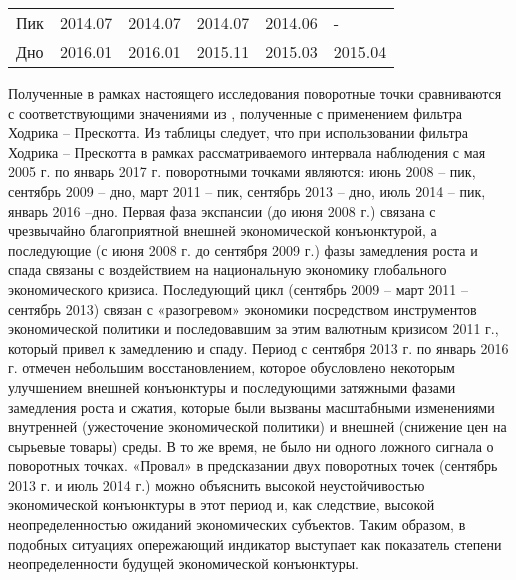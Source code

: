 \documentclass[a4paper,14pt]{extreport}
\begin{document}
\begin{table}[]
\begin{tabular}{|l|l|l|l|l|l|}
				Пик                                                                                                   & 2014.07                                                                                                                                                    & 2014.07                                                                    & 2014.07                                                                          & 2014.06                                                                   & -                                                                                \\
				Дно                                                                                                   & 2016.01                                                                                                                                                    & 2016.01                                                                    & 2015.11                                                                          & 2015.03                                                                   & 2015.04                                                                          \\ \hline
			\end{tabular}
		\label{tbl:tpoints_re}	
	\end{table}
	
	Полученные в рамках настоящего исследования поворотные точки сравниваются с соответствующими значениями из \cite{esiMakingAlt}, полученные с применением фильтра Ходрика -- Прескотта. Из таблицы следует, что при использовании фильтра Ходрика -- Прескотта  в   рамках рассматриваемого интервала наблюдения с мая 2005 г. по январь 2017 г. поворотными точками являются: июнь 2008 -- пик, сентябрь 2009 -- дно, март 2011 -- пик, сентябрь 2013 -- дно, июль 2014 -- пик, январь 2016 --дно. Первая фаза экспансии (до июня 2008 г.) связана с чрезвычайно благоприятной внешней экономической конъюнктурой, а последующие (с июня 2008 г. до сентября 2009 г.) фазы замедления роста и спада связаны с воздействием на национальную экономику глобального экономического кризиса. Последующий цикл (сентябрь 2009 -- март 2011 -- сентябрь 2013) связан с «разогревом» экономики посредством инструментов экономической политики и последовавшим за этим валютным кризисом 2011 г., который привел к замедлению и спаду. Период с сентября 2013 г. по январь 2016 г. отмечен небольшим восстановлением, которое обусловлено некоторым улучшением внешней конъюнктуры и последующими затяжными фазами замедления роста и сжатия, которые были вызваны масштабными изменениями внутренней (ужесточение экономической политики) и внешней (снижение цен на сырьевые товары) среды. В то же время, не было ни одного ложного сигнала о поворотных точках. «Провал» в предсказании двух поворотных точек (сентябрь 2013 г. и июль 2014 г.) можно объяснить высокой неустойчивостью экономической конъюнктуры в этот период и, как следствие, высокой неопределенностью ожиданий экономических субъектов. Таким образом, в подобных ситуациях опережающий индикатор выступает как показатель степени неопределенности будущей экономической конъюнктуры.
	
\end{document}
